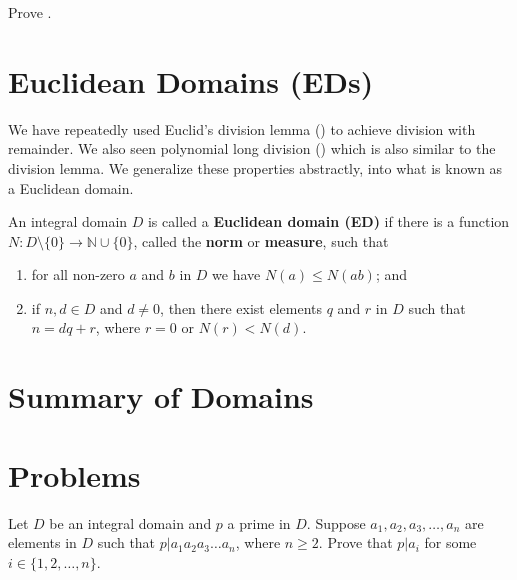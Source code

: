 \begin{exercise}\label{exercise-primitive-polynomial-irreducible-iff-polynomial-irreducible-in-field-of-fractions}
    Prove .
\end{exercise}

\section{Euclidean Domains (EDs)}
We have repeatedly used Euclid's division lemma () to achieve division with remainder. We also seen polynomial long division () which is also similar to the division lemma. We generalize these properties abstractly, into what is known as a Euclidean domain.

\begin{definition}
    An integral domain $D$ is called a \textbf{Euclidean domain (ED)} if there is a function $N: D \setminus \{0\} \to \mathbb{N} \cup \{0\}$, called the \textbf{norm} or \textbf{measure}, such that
    \begin{enumerate}
        \item for all non-zero $a$ and $b$ in $D$ we have $N(a) \leq N(ab)$; and
        \item if $n, d \in D$ and $d \neq 0$, then there exist elements $q$ and $r$ in $D$ such that $n = dq + r$, where $r = 0$ or $N(r) < N(d)$.
    \end{enumerate}
\end{definition}

\section{Summary of Domains}

\newpage

\section{Problems}
\begin{problem}\label{problem-prime-element-divides-some-element-in-product}
    Let $D$ be an integral domain and $p$ a prime in $D$. Suppose $a_1, a_2, a_3, \dots, a_n$ are elements in $D$ such that $p \vert a_1a_2a_3\dots a_n$, where $n \geq 2$. Prove that $p \vert a_i$ for some $i \in \{1, 2, \dots, n\}$.
\end{problem}

